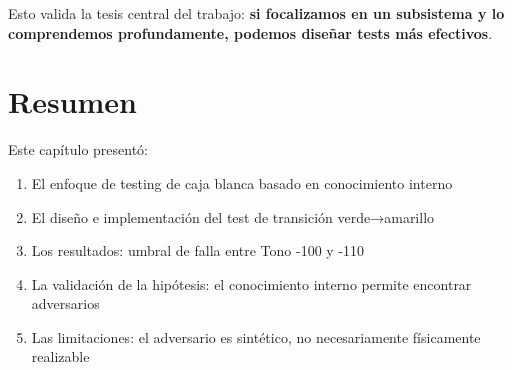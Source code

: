 Esto valida la tesis central del trabajo: \textbf{si focalizamos en un subsistema y lo comprendemos profundamente, podemos diseñar tests más efectivos}.

\section{Resumen}

Este capítulo presentó:

\begin{enumerate}
    \item El enfoque de testing de caja blanca basado en conocimiento interno

    \item El diseño e implementación del test de transición verde→amarillo

    \item Los resultados: umbral de falla entre Tono -100 y -110

    \item La validación de la hipótesis: el conocimiento interno permite encontrar adversarios

    \item Las limitaciones: el adversario es sintético, no necesariamente físicamente realizable
\end{enumerate}